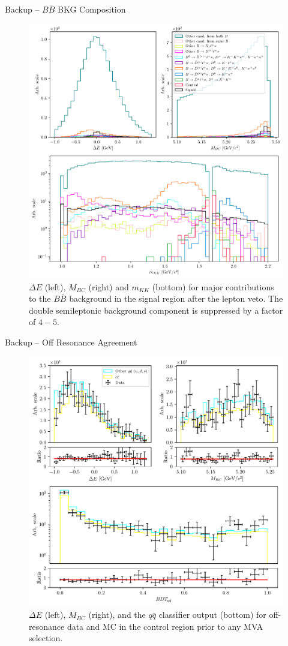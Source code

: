 \documentclass[serif]{beamer}
\begin{document}
\begin{frame}[t]{Backup -- $B \bar B$ BKG Composition}
\vspace{-3mm}
\small
\begin{figure}[H]
	\centering
	\includegraphics[width=0.52\linewidth]{fig/sig_BKG_composition_all_after}
	\caption{$\Delta E$ (left), $M_{BC}$ (right) and $m_{KK}$ (bottom) for major contributions to the $B \bar B$ background in the signal region after the lepton veto. The double semileptonic background component is suppressed by a factor of $4-5$.}
\end{figure} 
\end{frame}

\begin{frame}[t]{Backup -- Off Resonance Agreement}
\vspace{-3mm}
\small
\begin{figure}[H]
	\centering
	\includegraphics[width=0.58\linewidth]{fig/offres_control}
	\caption{$\Delta E$ (left), $M_{BC}$ (right), and the $q \bar q$ classifier output (bottom) for off-resonance data and MC in the control region prior to any MVA selection.}
\end{figure}
\end{frame}
\end{document}
